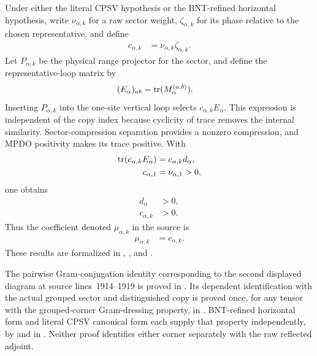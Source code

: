 \documentclass{article}
\begin{document}
Under either the literal CPSV hypothesis or the BNT-refined
horizontal hypothesis, write $\nu_{\alpha,k}$ for a raw sector weight,
$\zeta_{\alpha,k}$ for its phase relative to the chosen representative, and
define
\begin{align}
    c_{\alpha,k}
     & =\nu_{\alpha,k}\zeta_{\alpha,k}.
    \label{eq:cpgsv17_vertical_cf_grouping_grouped_coefficient}
\end{align}
Let $P_{\alpha,k}$ be the physical range projector for the sector, and define
the representative-loop matrix by
\begin{align}
    (E_\alpha)_{ab}
     & =\operatorname{tr}(M_\alpha^{(a,b)}).
    \label{eq:cpgsv17_vertical_cf_grouping_representative_loop}
\end{align}
Inserting $P_{\alpha,k}$ into the one-site vertical loop selects
$c_{\alpha,k}E_\alpha$. This expression is independent of the copy index
because cyclicity of trace removes the internal similarity. Sector-compression
separation provides a nonzero compression, and MPDO positivity makes its trace
positive. With
\begin{align}
    \operatorname{tr}(c_{\alpha,k}E_\alpha)
     & =c_{\alpha,k}d_\alpha,
    \label{eq:cpgsv17_vertical_cf_grouping_sector_trace} \\
    c_{\alpha,1}
     & =\nu_{\alpha,1}>0,
    \label{eq:cpgsv17_vertical_cf_grouping_representative_normalization}
\end{align}
one obtains
\begin{align}
    d_\alpha
     & >0,
    \label{eq:cpgsv17_vertical_cf_grouping_positive_loop_trace} \\
    c_{\alpha,k}
     & >0.
    \label{eq:cpgsv17_vertical_cf_grouping_positive_grouped_coefficient}
\end{align}
Thus the coefficient denoted $\mu_{\alpha,k}$ in the source is
\begin{align}
    \mu_{\alpha,k}
     & =c_{\alpha,k}.
    \label{eq:cpgsv17_vertical_cf_grouping_source_grouped_coefficient}
\end{align}
These results are formalized in ,
, and
.

The pairwise Gram-conjugation identity corresponding to the second displayed
diagram at source lines~1914--1919 is proved in
. Its dependent identification
with the actual grouped sector and distinguished copy is proved once, for any
tensor with the grouped-corner Gram-dressing property, in
. BNT-refined
horizontal form and literal CPSV canonical form each supply that property
independently, by
 and
 in
. Neither proof identifies
either corner separately with the raw reflected adjoint.
\end{document}
